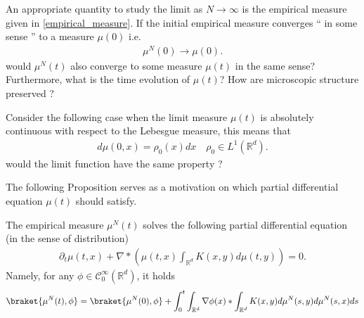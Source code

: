An appropriate quantity to study the limit as $N \to  \infty$ is the empirical measure given in \ref{empirical_measure}. If the initial empirical measure converges `` in some sense '' to a measure $\mu(0)$ i.e.
\begin{align*}
	\mu^{N}(0) \to \mu(0)
	.\end{align*}
would $\mu^N(t)$ also converge to some measure $\mu(t)$ in the same sense?
Furthermore, what is the time evolution of $\mu(t)$? How are microscopic structure preserved ?\\[1ex]
\begin{note}
	Consider the following case when the limit measure $\mu(t)$ is absolutely continuous with respect to the Lebesgue measure, this means that
	\begin{align*}
		d\mu(0,x) = \rho_0(x) dx \quad \rho_0 \in  L^{1}(\mathbb{R}^{d} )
		.\end{align*}
	would the limit function have the same property ?
\end{note}
\vskip5mm
The following Proposition serves as a motivation on which partial differential equation $\mu(t)$ should satisfy.
\begin{prop}
	The empirical measure $\mu^N(t)$ solves the following partial differential equation (in the sense of distribution)
	\begin{align*}
		\partial_t \mu(t,x) + \nabla * \left( \mu(t,x) \int_{\mathbb{R}^{d} } K(x,y) d\mu(t,y) \right)  = 0
		.\end{align*}
	Namely, for any $\phi  \in  \mathcal{C}_0^{\infty}(\mathbb{R}^{d} )$, it holds
	\begin{align*}
		\braket{\mu^N(t),\phi }=\braket{\mu^N(0),\phi }+\int^t_0  \int_{\mathbb{R}^{d} } \nabla \phi (x) * \int_{\mathbb{R}^{d} } K(x,y) d\mu^N(s,y)d\mu^N(s,x) ds
	\end{align*}
\end{prop}
